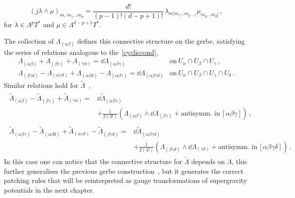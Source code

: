 \documentclass[debug]{phd}
\begin{document}
							 	\begin{equation}
									\left(j \lambda \wedge \mu\right)_{m,\,m_1\ldots m_d} = \frac{d!}{(p-1)!(d-p+1)!}\,\lambda_{m[m_1\ldots m_{p-1}}\mu_{m_p\ldots m_d]}\, ,
								\end{equation}
for $\lambda \in \Lambda^{p}T^*$ and $\mu \in \Lambda^{d-p+1}T^*$.

						The collection of $\Lambda_{(\alpha\beta)}$ defines this connective structure on the gerbe, satisfying the series of relations analogous to the~\eqref{cycliccond},
								\begin{equation}
									\begin{array}{lr}
										\Lambda_{(\alpha\beta)} + \Lambda_{(\beta\gamma)} +\Lambda_{(\gamma\alpha)} = \dd \Lambda_{(\alpha\beta\gamma)} & \mbox{on} \ U_\alpha \cap U_\beta \cap U_\gamma \, , \\
										\Lambda_{(\beta\gamma\delta)} - \Lambda_{(\alpha\gamma\delta)} + \Lambda_{(\alpha\beta\delta)} - \Lambda_{(\alpha\beta\gamma)} = \dd \Lambda_{(\alpha\beta\gamma\delta)} & \mbox{on} \ U_\alpha \cap U_\beta \cap U_\gamma \cap U_\delta \, .
									\end{array}
								\end{equation}
						Similar relations hold for $\tilde{\Lambda}$~\cite{waldram4}, 
								\begin{align*}
									\begin{split}
										\tilde{\Lambda}_{(\alpha\beta)} - \tilde{\Lambda}_{(\beta\gamma)} +\tilde{\Lambda}_{(\gamma\alpha)} = &\dd \tilde{\Lambda}_{(\alpha\beta\gamma)} \\
										& + \tfrac{1}{2 (3!)}\left(\Lambda_{(\alpha\beta)} \wedge \dd \Lambda_{(\beta\gamma)} + \mbox{antisymm. in}\, [\alpha\beta\gamma] \right) \, ,
									\end{split}
									\\[2mm]
									\begin{split}
										\tilde{\Lambda}_{(\alpha\beta\gamma)} - \tilde{\Lambda}_{(\alpha\beta\delta)} + \tilde{\Lambda}_{(\alpha\gamma\delta)} - \tilde{\Lambda}_{(\beta\gamma\delta)} = &\dd \tilde{\Lambda}_{(\alpha\beta\gamma\delta)} \\
										& + \tfrac{1}{2 (4!)}\left(\Lambda_{(\beta\gamma\delta)} \wedge \dd \Lambda_{(\gamma\delta)} + \mbox{antisymm. in}\, [\alpha\beta\gamma\delta] \right)\, .
									\end{split}
								\end{align*}
						In this case one can notice that the connective structure for $\tilde{\Lambda}$ depends on $\Lambda$, this further generalises the previous gerbe construction~\cite{HitchinLagrangian}, but it generates the correct patching rules that will be reinterpreted as gauge transformations of supergravity potentials in the next chapter.
\end{document}
